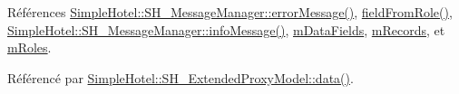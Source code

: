 Références \hyperlink{classSimpleHotel_1_1SH__MessageManager_a77bc12a66f3eaa8f3668d8197c0b8f6d}{Simple\-Hotel\-::\-S\-H\-\_\-\-Message\-Manager\-::error\-Message()}, \hyperlink{classSimpleHotel_1_1SH__SqlDataModel_a37479e0592c4a8e671f6fb6d1162f1f8}{field\-From\-Role()}, \hyperlink{classSimpleHotel_1_1SH__MessageManager_a76697bfabd6917a3b20ed58c22a34ed7}{Simple\-Hotel\-::\-S\-H\-\_\-\-Message\-Manager\-::info\-Message()}, \hyperlink{classSimpleHotel_1_1SH__SqlDataModel_aa583366a8960adea9a0719a63fa03a24}{m\-Data\-Fields}, \hyperlink{classSimpleHotel_1_1SH__SqlDataModel_af73abbb951de936944285571f34407c5}{m\-Records}, et \hyperlink{classSimpleHotel_1_1SH__SqlDataModel_a2a8b95a8c1dc58f69ef1b67ef5247093}{m\-Roles}.



Référencé par \hyperlink{classSimpleHotel_1_1SH__ExtendedProxyModel_a25bc1047c6e9835d9d3c580e0a4ec42a}{Simple\-Hotel\-::\-S\-H\-\_\-\-Extended\-Proxy\-Model\-::data()}.



